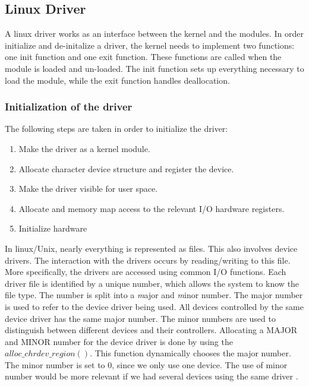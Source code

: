 \subsection{Linux Driver}
A linux driver works as an interface between the kernel and the modules. In order initialize and de-initalize a driver, the kernel needs to implement two functions: one init function and one exit function. These functions are called when the module is loaded and un-loaded. The init function sets up everything necessary to load the module, while the exit function handles deallocation. 


\subsubsection{Initialization of the driver}

The following steps are taken in order to initialize the driver:

\begin{enumerate}
    \item Make the driver as a kernel module.
    \item Allocate character device structure and register the device. 
    \item Make the driver visible for user space.
    \item Allocate and memory map access to the relevant I/O hardware registers. 
    \item Initialize hardware
\end{enumerate}

In linux/Unix, nearly everything is represented as files. This also involves device drivers. The interaction with the drivers occurs by reading/writing to this file. More specifically, the drivers are accessed using common I/O functions. Each driver file is identified by a unique number, which allows the system to know the file type. The number is split into a \emph major and \emph minor number. The major number is used to refer to the device driver being used. All devices controlled by the same device driver has the same major number. The minor numbers are used to distinguish between different devices and their controllers. Allocating a MAJOR and MINOR number for the device driver is done by using the $alloc\_chrdev\_region()$. This function dynamically chooses the major number. The minor number is set to 0, since we only use one device. The use of minor number would be more relevant if we had several devices using the same driver \cite{linux}. 

